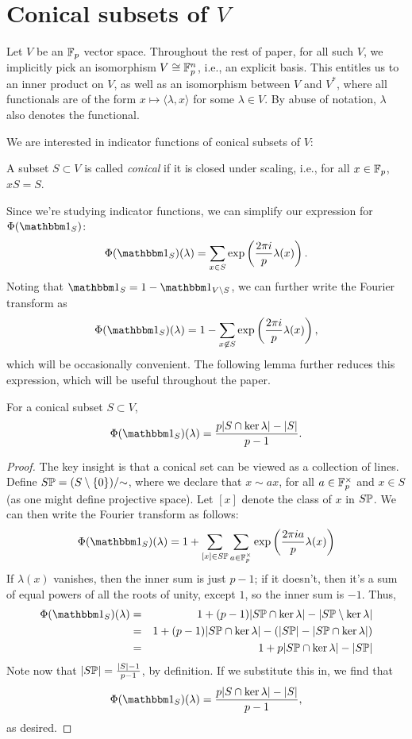 \section{Conical subsets of $V$}\label{sec:part0}

Let $V$ be an $\F_p$ vector space.
Throughout the rest of paper, for all such $V$, we implicitly pick an isomorphism 
	$V\cong\F_p^n$, i.e., an explicit basis. This
	entitles us to an inner product on $V$, as well as an isomorphism between $V$ and
	$V^*$, where all functionals are of the form $x \mapsto \langle \lambda, x \rangle$
	for some $\lambda\in V$. By abuse of notation, $\lambda$ also denotes the functional.

We are interested in indicator functions of conical subsets of $V$:
\begin{defn}
    A subset $S\subset V$ is called \emph{conical} if it is closed under scaling,
    i.e., for all $x\in \F_p$, $xS = S$.    
\end{defn}
Since we're studying indicator functions, we can simplify our expression for 
$\Phi(\IND_S)$:
\[ \Phi(\IND_S)(\lambda) = \sum_{x\in S} \exp \left(\frac{2\pi i}{p} \lambda(x)\right). \]
Noting that $\IND_S = 1 - \IND_{V\setminus S}$, we can further write the Fourier transform as
\[ \Phi(\IND_S)(\lambda) = 1 - \sum_{x\not\in S} \exp \left(\frac{2\pi i}{p} \lambda(x)\right), \]
which will be occasionally convenient. The following lemma further reduces this expression,
which will be useful throughout the paper.
\begin{lem}\label{lem:FT-conical-subset}
	For a conical subset $S \subset V$,
	\[ \Phi(\IND_S)(\lambda) = \frac{p|S \cap \ker \lambda| - |S|}{p-1}. \]
	\begin{proof}
	   The key insight is that a conical set can be viewed as a collection of lines.
	   Define $S\P = (S\setminus\{0\}) / {\sim}$, where we declare that 
	   $x \sim a x$, for all $a\in\F_p^\times$ and
	   $x\in S$ (as one might define projective space). Let $[x]$ denote the class
	   of $x$ in $S\P$. We can then write the Fourier transform as follows:
	   \[ \Phi(\IND_S)(\lambda) = 
	           1 + \sum_{[x]\in S\P} 
	               \sum_{a\in\F_p^\times} \exp \left(\frac{2\pi i a}{p} \lambda(x)\right) \]
	   If $\lambda(x)$ vanishes, then the inner sum is just $p-1$; if it doesn't, then it's
	   a sum of equal powers of all the roots of unity, except $1$, so the inner sum is $-1$.
	   Thus,
	   \begin{eqnarray*}
	       \Phi(\IND_S)(\lambda)
	       &=& 1 + 
	           (p-1)|S\P \cap \ker \lambda| - 
	           |S\P \setminus \ker\lambda| \\
	       &=& 1 + 
	           (p-1)|S\P \cap \ker \lambda| - 
	           (|S\P| - |S\P \cap \ker\lambda|) \\
	       &=& 1 + 
	           p|S\P \cap \ker \lambda| - |S\P|
	   \end{eqnarray*}
	   Note now that $|S\P| = \frac{|S| - 1}{p-1}$, by definition. If we substitute
	   this in, we find that 
	   \[ \Phi(\IND_S)(\lambda) = \frac{p|S \cap \ker \lambda| - |S|}{p-1}, \]
	   as desired.
	\end{proof}
\end{lem}

